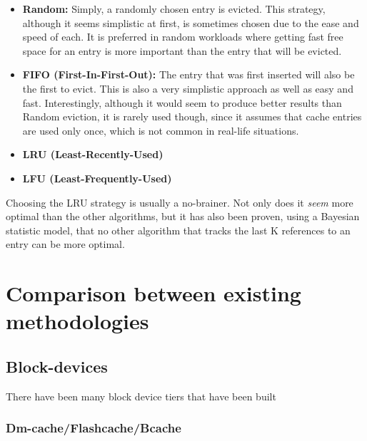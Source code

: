 %
\begin{itemize}
	\item \textbf{Random:} Simply, a randomly chosen entry is evicted. This 
		strategy, although it seems simplistic at first, is sometimes chosen 
		due to the ease and speed of each. It is preferred in random workloads 
		where getting fast free space for an entry is more important than the 
		entry that will be evicted.
	\item \textbf{FIFO (First-In-First-Out):} The entry that was first inserted 
		will also be the first to evict. This is also a very simplistic 
		approach as well as easy and fast. Interestingly, although it would 
		seem to produce better results than Random eviction, it is rarely used 
		though, since it assumes that cache entries are used only once, which 
		is not common in real-life situations.
	\item \textbf{LRU (Least-Recently-Used)}
	\item \textbf{LFU (Least-Frequently-Used)}
\end{itemize}

Choosing the LRU strategy is usually a no-brainer. Not only does it 
\textit{seem} more optimal than the other algorithms, but it has also been 
proven, using a Bayesian statistic model, that no other algorithm that tracks 
the last K references to an entry can be more optimal.



\section{Comparison between existing methodologies}

\subsection{Block-devices}

There have been many block device tiers that have been built


\subsubsection{Dm-cache/Flashcache/Bcache}

